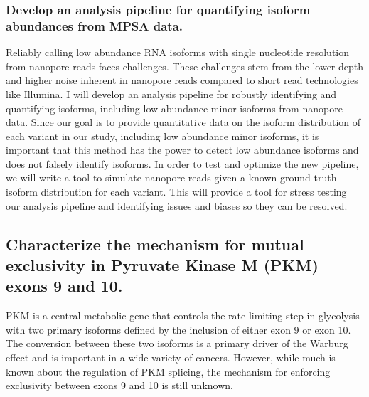 \documentclass{article}
\begin{document}
\subsubsection{Develop an analysis pipeline for quantifying isoform abundances from MPSA data.} \label{aim:pipeline_dev}
Reliably calling low abundance RNA isoforms with single nucleotide resolution from nanopore reads faces challenges.
These challenges stem from the lower depth and higher noise inherent in nanopore reads compared to short read technologies like Illumina.
I will develop an analysis pipeline for robustly identifying and quantifying isoforms, including low abundance minor isoforms from nanopore data.
Since our goal is to provide quantitative data on the isoform distribution of each variant in our study, including low abundance minor isoforms, it is important that this method has the power to detect low abundance isoforms and does not falsely identify isoforms.
In order to test and optimize the new pipeline, we will write a tool to simulate nanopore reads given a known ground truth isoform distribution for each variant.
This will provide a tool for stress testing our analysis pipeline and identifying issues and biases so they can be resolved.
%
\subsection{Characterize the mechanism for mutual exclusivity in Pyruvate Kinase M (PKM) exons 9 and 10.}
PKM is a central metabolic gene that controls the rate limiting step in glycolysis with two primary isoforms defined by the inclusion of either exon 9 or exon 10. 
The conversion between these two isoforms is a primary driver of the Warburg effect and is important in a wide variety of cancers.\Cite{Christofk2008-bu,Ma2022-dt} 
However, while much is known about the regulation of PKM splicing, the mechanism for enforcing exclusivity between exons 9 and 10 is still unknown.
%
\end{document}

